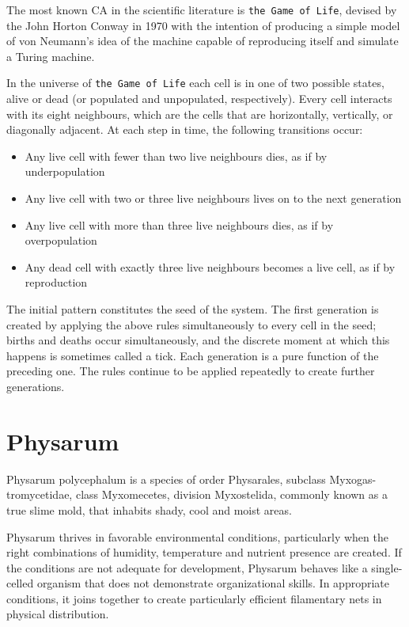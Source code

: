 The most known CA in the scientific literature is \texttt{the Game of Life}, devised by the John Horton Conway in 1970 with the intention of producing a simple model of von Neumann's idea of the machine capable of reproducing itself and simulate a Turing machine. 
\par
In the universe of \texttt{the Game of Life} each cell is in one of two possible states, alive or dead (or populated and unpopulated, respectively). Every cell interacts with its eight neighbours, which are the cells that are horizontally, vertically, or diagonally adjacent. At each step in time, the following transitions occur:
\begin{itemize}
\item Any live cell with fewer than two live neighbours dies, as if by underpopulation
\item Any live cell with two or three live neighbours lives on to the next generation
\item Any live cell with more than three live neighbours dies, as if by overpopulation
\item Any dead cell with exactly three live neighbours becomes a live cell, as if by reproduction
\end{itemize}
\par
The initial pattern constitutes the seed of the system. The first generation is created by applying the above rules simultaneously to every cell in the seed; births and deaths occur simultaneously, and the discrete moment at which this happens is sometimes called a tick. Each generation is a pure function of the preceding one. The rules continue to be applied repeatedly to create further generations. 

\section{Physarum}

Physarum polycephalum\cite{Tsompanas2016} is a species of order Physarales, subclass Myxogas-tromycetidae, class Myxomecetes, division Myxostelida, commonly known as a true slime mold, that inhabits shady, cool and moist areas. 
\par
Physarum thrives in favorable environmental conditions, particularly when the right combinations of humidity, temperature and nutrient presence are created. If the conditions are not adequate for development, Physarum behaves like a single-celled organism that does not demonstrate organizational skills. In appropriate conditions, it joins together to create particularly efficient filamentary nets in physical distribution.
